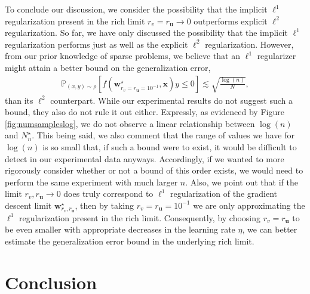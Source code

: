 \documentclass{article}
\begin{document}
To conclude our discussion, we consider the possibility that the implicit $\ell^1$ regularization present in the rich limit $r_v = r_{\boldsymbol{u}} \rightarrow 0$ outperforms explicit $\ell^2$ regularization. So far, we have only discussed the possibility that the implicit $\ell^1$ regularization performs just as well as the explicit $\ell^2$ regularization. However, from our prior knowledge of sparse problems, we believe that an $\ell^1$ regularizer might attain a better bound on the generalization error,
\begin{align*}
   \mathbb{P}_{(x,y) \sim \rho}[f(\boldsymbol{w}_{r_v = r_{\boldsymbol{u}} = 10^{-1}}^{\star}, \boldsymbol{x})y \leq 0] \lesssim \sqrt{\frac{\log(n)}{N}},
\end{align*}
than its $\ell^2$ counterpart. While our experimental results do not suggest such a bound, they also do not rule it out either. Expressly, as evidenced by Figure \ref{fig:numsampleslog}, we do not observe a linear relationship between $\log(n)$ and $N_n^{\star}$. This being said, we also comment that the range of values we have for $\log(n)$ is so small that, if such a bound were to exist, it would be difficult to detect in our experimental data anyways. Accordingly, if we wanted to more rigorously consider whether or not a bound of this order exists, we would need to perform the same experiment with much larger $n$. Also, we point out that if the limit $r_v, r_{\boldsymbol{u}} \rightarrow 0$ does truly correspond to $\ell^1$ regularization of the gradient descent limit $\boldsymbol{w}_{r_v, r_{\boldsymbol{u}}}^{\star}$, then by taking $r_v = r_{\boldsymbol{u}} = 10^{-1}$ we are only approximating the $\ell^1$ regularization present in the rich limit. Consequently, by choosing $r_v = r_{\boldsymbol{u}}$ to be even smaller with appropriate decreases in the learning rate $\eta$, we can better estimate the generalization error bound in the underlying rich limit.

\section{Conclusion}
\end{document}
